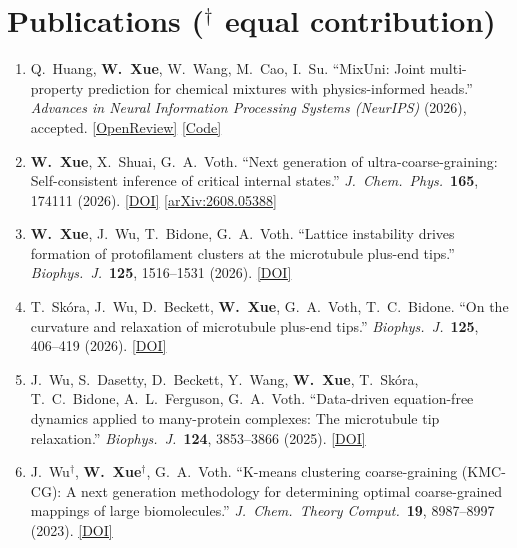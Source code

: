 \documentclass[letterpaper,10.5pt]{article}
\newcommand{\resumePub}[1]{\item\small{#1}\vspace{-2pt}}
\begin{document}
\section{Publications \normalfont\small\upshape($^\dagger$ equal contribution)}
  \begin{enumerate}[leftmargin=0.22in, itemsep=1pt]
    \resumePub{Q.\ Huang, \textbf{W.\ Xue}, W.\ Wang, M.\ Cao, I.\ Su. ``MixUni: Joint multi-property prediction for chemical mixtures with physics-informed heads.'' \textit{Advances in Neural Information Processing Systems (NeurIPS)} (2026), accepted. \href{https://openreview.net/forum?id=e3HTIyxtsJ}{[OpenReview]} \href{https://github.com/qinanh/MixUni}{[Code]}}
    \resumePub{\textbf{W.\ Xue}, X.\ Shuai, G.\ A.\ Voth. ``Next generation of ultra-coarse-graining: Self-consistent inference of critical internal states.'' \textit{J.\ Chem.\ Phys.}\ \textbf{165}, 174111 (2026). \href{https://doi.org/10.1063/5.0352901}{[DOI]} \href{https://arxiv.org/abs/2608.05388}{[arXiv:2608.05388]}}
    \resumePub{\textbf{W.\ Xue}, J.\ Wu, T.\ Bidone, G.\ A.\ Voth. ``Lattice instability drives formation of protofilament clusters at the microtubule plus-end tips.'' \textit{Biophys.\ J.}\ \textbf{125}, 1516--1531 (2026). \href{https://doi.org/10.1016/j.bpj.2026.02.013}{[DOI]}}
    \resumePub{T.\ Sk\'ora, J.\ Wu, D.\ Beckett, \textbf{W.\ Xue}, G.\ A.\ Voth, T.\ C.\ Bidone. ``On the curvature and relaxation of microtubule plus-end tips.'' \textit{Biophys.\ J.}\ \textbf{125}, 406--419 (2026). \href{https://doi.org/10.1016/j.bpj.2025.07.003}{[DOI]}}
    \resumePub{J.\ Wu, S.\ Dasetty, D.\ Beckett, Y.\ Wang, \textbf{W.\ Xue}, T.\ Sk\'ora, T.\ C.\ Bidone, A.\ L.\ Ferguson, G.\ A.\ Voth. ``Data-driven equation-free dynamics applied to many-protein complexes: The microtubule tip relaxation.'' \textit{Biophys.\ J.}\ \textbf{124}, 3853--3866 (2025). \href{https://doi.org/10.1016/j.bpj.2025.01.009}{[DOI]}}
    \resumePub{J.\ Wu$^\dagger$, \textbf{W.\ Xue}$^\dagger$, G.\ A.\ Voth. ``K-means clustering coarse-graining (KMC-CG): A next generation methodology for determining optimal coarse-grained mappings of large biomolecules.'' \textit{J.\ Chem.\ Theory Comput.}\ \textbf{19}, 8987--8997 (2023). \href{https://doi.org/10.1021/acs.jctc.3c01053}{[DOI]}}
  \end{enumerate}

\end{document}
